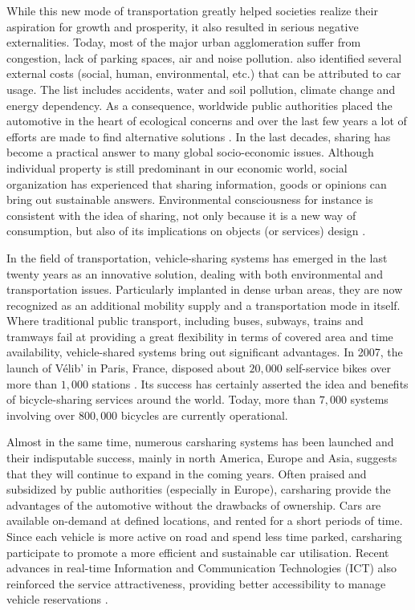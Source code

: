 \begin{bibunit}[ieeetr]
\medskip
While this new mode of transportation greatly helped societies realize their aspiration for growth and prosperity, it also resulted in serious negative externalities.
Today, most of the major urban agglomeration suffer from congestion, lack of parking spaces, air and noise pollution.
\cite{maibach_handbook_2007} also identified several external costs (social, human, environmental, etc.) that can be attributed to car usage.
The list includes accidents, water and soil pollution, climate change and energy dependency.
As a consequence, worldwide public authorities placed the automotive in the heart of ecological concerns and over the last few years a lot of efforts are made to find alternative solutions \cite{mitchell_reinventing_2010}.
In the last decades, sharing has become a practical answer to many global socio-economic issues.
Although individual property is still predominant in our economic world, social organization has experienced that sharing information, goods or opinions can bring out sustainable answers.
Environmental consciousness for instance is consistent with the idea of sharing, not only because it is a new way of consumption, but also of its implications on objects (or services) design \cite{ciari_sharing_2012}.

\medskip
In the field of transportation, vehicle-sharing systems has emerged in the last twenty years as an innovative solution, dealing with both environmental and transportation issues.
Particularly implanted in dense urban areas, they are now recognized as an additional mobility supply and a transportation mode in itself.
Where traditional public transport, including buses, subways, trains and tramways fail at providing a great  flexibility in terms of covered area and time availability, vehicle-shared systems bring out significant advantages.
In 2007, the launch of V{\'e}lib' in Paris, France, disposed about $20,000$ self-service bikes over more than $1,000$ stations \cite{laporte_shared_2015}.
Its success has certainly asserted the idea and benefits of bicycle-sharing services around the world.
Today, more than $7,000$ systems involving over $800,000$ bicycles are currently operational.

Almost in the same time, numerous carsharing systems has been launched and their indisputable success, mainly in north America, Europe and Asia, suggests that they will continue to expand in the coming years.
Often praised and subsidized by public authorities (especially in Europe), carsharing provide the advantages of the automotive without the drawbacks of ownership.
Cars are available on-demand at defined locations, and rented for a short periods of time.
Since each vehicle is more active on road and spend less time parked, carsharing participate to promote a more efficient and sustainable car utilisation.
Recent advances in real-time Information and Communication Technologies (ICT) also reinforced the service attractiveness, providing better accessibility to manage vehicle reservations \cite{jorge_carsharing_2013}.



\end{bibunit}
